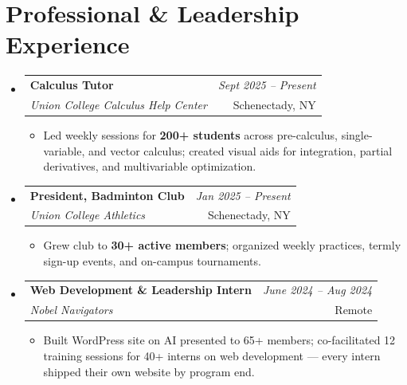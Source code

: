 \documentclass[letterpaper,11pt]{article}
\makeatletter
\newcommand{\resumeItem}[1]{\item\small{#1\vspace{-2pt}}}
\newcommand{\resumeSubheading}[4]{
  \vspace{-1pt}\item
    \begin{tabular*}{0.97\textwidth}[t]{l@{\extracolsep{\fill}}r}
      \textbf{#1} & \textit{\small #4} \\
      \textit{\small#3} & #2 \\
    \end{tabular*}\vspace{-6pt}
}
\newcommand{\resumeSubHeadingListStart}{\begin{itemize}[leftmargin=0.15in, label={}]}
\newcommand{\resumeSubHeadingListEnd}{\end{itemize}}
\newcommand{\resumeItemListStart}{\begin{itemize}[leftmargin=0.15in, label=\textbullet, itemsep=-2pt, topsep=0pt]}
\newcommand{\resumeItemListEnd}{\end{itemize}\vspace{-4pt}}
\makeatother
\begin{document}
\section{Professional \& Leadership Experience}
\resumeSubHeadingListStart

  \resumeSubheading{Calculus Tutor}{Schenectady, NY}
    {Union College Calculus Help Center}{Sept 2025 -- Present}
    \resumeItemListStart
      \resumeItem{Led weekly sessions for \textbf{200+ students} across pre-calculus, single-variable, and vector calculus; created visual aids for integration, partial derivatives, and multivariable optimization.}
    \resumeItemListEnd

  \resumeSubheading{President, Badminton Club}{Schenectady, NY}
    {Union College Athletics}{Jan 2025 -- Present}
    \resumeItemListStart
      \resumeItem{Grew club to \textbf{30+ active members}; organized weekly practices, termly sign-up events, and on-campus tournaments.}
    \resumeItemListEnd

  \resumeSubheading{Web Development \& Leadership Intern}{Remote}
    {Nobel Navigators}{June 2024 -- Aug 2024}
    \resumeItemListStart
      \resumeItem{Built WordPress site on AI presented to 65+ members; co-facilitated 12 training sessions for 40+ interns on web development — every intern shipped their own website by program end.}
    \resumeItemListEnd

\resumeSubHeadingListEnd
\end{document}
